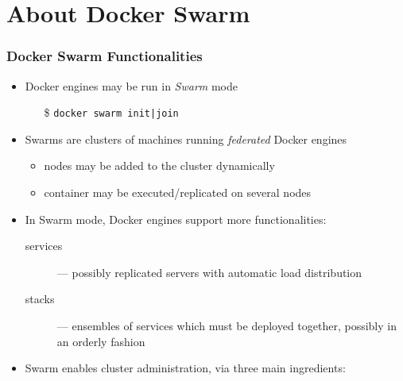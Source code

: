 \documentclass[presentation]{beamer}\mode<presentation>{\usetheme{AMSBolognaFC}}
\begin{document}
\section{About Docker Swarm}

\begin{frame}[allowframebreaks]
    \frametitle{Docker Swarm Functionalities}
    \label{frame:swarm}

    \begin{itemize}
        \item Docker engines may be run in \emph{Swarm} mode
        \begin{itemize}
            \item[\$] \texttt{docker swarm init{\color{gray}|join}}
        \end{itemize}

        \bigskip

        \item Swarms are \alert{clusters} of machines running \emph{federated} Docker engines
        \begin{itemize}
            \item nodes may be added to the cluster dynamically
            \item container may be executed/replicated on several nodes
        \end{itemize}

        \bigskip

        \item In Swarm mode, Docker engines support more functionalities:
        \begin{description}
                \item[services] --- possibly \alert{replicated} servers with automatic load distribution
            \item[stacks] --- ensembles of services which must be deployed together, possibly in an orderly fashion
        \end{description}

        \framebreak

        \item Swarm enables \alert{cluster administration}, via three main ingredients:
    \end{itemize}


\end{frame}
\end{document}
